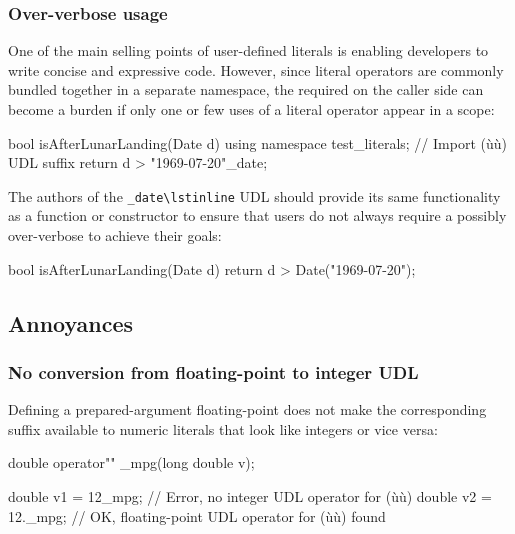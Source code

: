 \subsubsection[Over-verbose usage]{Over-verbose usage}

One of the main selling points of user-defined literals is enabling developers to write concise and expressive code. However, since literal operators are commonly bundled together in a separate namespace, the required  on the caller side can become a burden if only one or few uses of a literal operator appear in a scope:

\begin{emcppslisting}
bool isAfterLunarLanding(Date d)
{
    using namespace test_literals;  // Import (ù{}ù) UDL suffix
    return d > "1969-07-20"_date;
}
\end{emcppslisting}

\noindent The authors of the \lstinline!_date\lstinline! UDL should provide its same functionality as a function or constructor to ensure that users do not always require a possibly over-verbose  to achieve their goals:

\begin{emcppslisting}
bool isAfterLunarLanding(Date d)
{
    return d > Date("1969-07-20");
}
\end{emcppslisting}

    

\subsection[Annoyances]{Annoyances}\label{annoyances}

\subsubsection[No conversion from floating-point to integer \lstinline!UDL!]{No conversion from floating-point to integer {\SubsubsecCode UDL}}\label{no-conversion-from-floating-point-to-integer-udl}

Defining a prepared-argument floating-point  does
not make the corresponding suffix available to numeric literals that
look like integers or vice versa:

\begin{emcppslisting}
double operator"" _mpg(long double v);

double v1 = 12_mpg;   // Error, no integer UDL operator for (ù{}ù)
double v2 = 12._mpg;  // OK, floating-point UDL operator for (ù{}ù) found
\end{emcppslisting}
    
